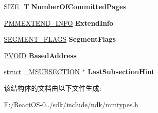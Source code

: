 \begin{DoxyCompactItemize}
\item 
\mbox{\label{struct___m_a_p_p_e_d___f_i_l_e___s_e_g_m_e_n_t_a7fa93d3f7bd3992d7b134ccf53197574}} 
S\+I\+Z\+E\+\_\+T {\bfseries Number\+Of\+Committed\+Pages}
\item 
\mbox{\label{struct___m_a_p_p_e_d___f_i_l_e___s_e_g_m_e_n_t_a2bc8c6eb81d4190a50cb6431c4166421}} 
\hyperlink{struct___m_m_e_x_t_e_n_d___i_n_f_o}{P\+M\+M\+E\+X\+T\+E\+N\+D\+\_\+\+I\+N\+FO} {\bfseries Extend\+Info}
\item 
\mbox{\label{struct___m_a_p_p_e_d___f_i_l_e___s_e_g_m_e_n_t_a7fbad8f97c4bef054e4f6024e177bccf}} 
\hyperlink{struct___s_e_g_m_e_n_t___f_l_a_g_s}{S\+E\+G\+M\+E\+N\+T\+\_\+\+F\+L\+A\+GS} {\bfseries Segment\+Flags}
\item 
\mbox{\label{struct___m_a_p_p_e_d___f_i_l_e___s_e_g_m_e_n_t_ad3fb4ca888a315ac1b9a5f229383e37c}} 
\hyperlink{interfacevoid}{P\+V\+O\+ID} {\bfseries Based\+Address}
\item 
\mbox{\label{struct___m_a_p_p_e_d___f_i_l_e___s_e_g_m_e_n_t_af6712e77046792ceeba427de0f3fd1e8}} 
\hyperlink{interfacestruct}{struct} \hyperlink{struct___m_s_u_b_s_e_c_t_i_o_n}{\+\_\+\+M\+S\+U\+B\+S\+E\+C\+T\+I\+ON} $\ast$ {\bfseries Last\+Subsection\+Hint}
\end{DoxyCompactItemize}


该结构体的文档由以下文件生成\+:\begin{DoxyCompactItemize}
\item 
E\+:/\+React\+O\+S-\/0../sdk/include/ndk/mmtypes.\+h\end{DoxyCompactItemize}
